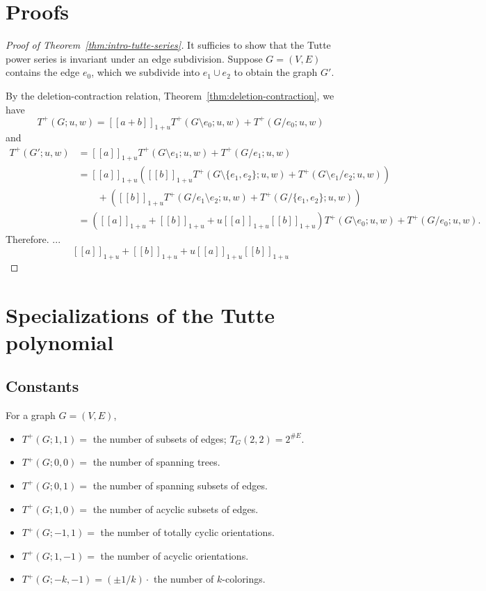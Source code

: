 \documentclass{amsart}
\theoremstyle{definition}
\newcommand{\fanalog}[2]{[\![#2]\!]_{#1}}
\begin{document}
\section{Proofs}

\begin{proof}[Proof of Theorem~\ref{thm:intro-tutte-series}]
It sufficies to show that the Tutte power series is invariant 
under an edge subdivision.
Suppose $G = (V,E)$ contains the edge $e_0$, which we subdivide into $e_1 \cup e_2$ to obtain the graph $G'$.

By the deletion-contraction relation, Theorem~\ref{thm:deletion-contraction},
we have
\[
	T^+(G; u,w) = \fanalog{1 + u}{a + b} T^+(G\setminus e_0; u,w) + T^+(G/e_0; u,w)
\]
and 
\begin{align*}
	T^+(G'; u,w) &= \fanalog{1 + u}{a} T^+(G\setminus e_1; u,w) + T^+(G/e_1; u,w)\\
	&= \fanalog{1 + u}{a}\left(\fanalog{1 + u}{b} T^+(G\setminus\{e_1,e_2\}; u,w) + T^+(G \setminus e_1 / e_2; u,w)\right) \\
	&\qquad + \left(\fanalog{1 + u}{b} T^+(G/e_1 \setminus e_2; u,w) + T^+(G/\{e_1,e_2\}; u,w) \right)\\
	&= (\fanalog{1 + u}{a} + \fanalog{1 + u}{b} + u\fanalog{1 + u}{a}\fanalog{1 + u}{b}) T^+(G\setminus e_0; u,w) + T^+(G/e_0; u,w) .
\end{align*}
Therefore. ... 
\[
\fanalog{1 + u}{a} + \fanalog{1 + u}{b} + u \fanalog{1 + u}{a} \fanalog{1 + u}{b}
\]
\end{proof}

\section{Specializations of the Tutte polynomial}

\subsection{Constants}
For a graph $G = (V,E)$,
\begin{itemize}
\item 
$T^+(G;1,1)=$  the number of subsets of edges;
$T_G(2,2) = 2^{\# E}$.

\item 
$T^+(G;0,0) =$ the number of spanning trees.

\item 
$T^+(G;0,1) =$ the number of spanning subsets of edges.

\item 
$T^+(G;1,0) =$ the number of acyclic subsets of edges.

\item 
$T^+(G;-1,1) =$ the number of totally cyclic orientations.

\item 
$T^+(G;1,-1) =$ the number of acyclic orientations.

\item 
$T^+(G; -k, -1) = (\pm 1/k)\cdot$ the number of $k$-colorings.
\end{itemize}
\end{document}
